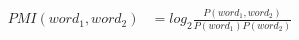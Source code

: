 \documentclass[10pt]{article}
\begin{document}
\begin{align*}PMI(word_1,word_2)&=log_2{\frac{P(word_1,word_2)}{P(word_1)P(word_2)}}\end{align*}
\end{document}
